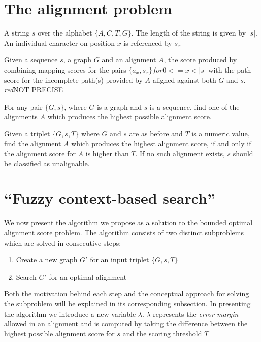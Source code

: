 \documentclass[thesis.tex]{subfiles}
\begin{document}
\section{The alignment problem}
\begin{defn}
  A string $s$ over the alphabet $\{A, C, T, G\}$. The length of the string is given by $|s|$. An individual character on position $x$ is referenced by $s_x$
\end{defn}
\begin{defn}
  Given a sequence $s$, a graph $G$ and an alignment $A$, the score produced by combining mapping scores for the pairs $\{a_x, s_x\} for 0<=x<|s|$ with the path score for the incomplete path(s) provided by $A$ aligned against both $G$ and $s$. \textit{red}{NOT PRECISE}
\end{defn}
\begin{defn}
  For any pair $\{G, s\}$, where $G$ is a graph and $s$ is a sequence, find one of the alignments $A$ which produces the highest possible alignment score.
\end{defn}
\begin{defn}
  \label{def:bounded_alignment_problem}
  Given a triplet $\{G, s, T\}$ where $G$ and $s$ are as before and $T$ is a numeric value, find the alignment $A$ which produces the highest alignment score, if and only if the alignment score for $A$ is higher than $T$. If no such alignment exists, $s$ should be classified as unalignable.
\end{defn}
\section{``Fuzzy context-based search''}
We now present the algorithm we propose as a solution to the bounded optimal alignment score problem. The algorithm consists of two distinct subproblems which are solved in consecutive steps:
\begin{enumerate}
  \item Create a new graph $G'$ for an input triplet $\{G, s, T\}$
  \item Search $G'$ for an optimal alignment
\end{enumerate}
Both the motivation behind each step and the conceptual approach for solving the subproblem will be explained in its corresponding subsection. In presenting the algorithm we introduce a new variable $\lambda$. $\lambda$ represents the \textit{error margin} allowed in an alignment and is computed by taking the difference between the highest possible alignment score for $s$ and the scoring threshold $T$
\end{document}
